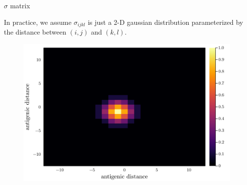 \documentclass{beamer}
\begin{document}
\begin{frame}{$\sigma$ matrix}
    
    In practice, we assume $\sigma_{ijkl}$ is just a 2-D gaussian distribution parameterized by the distance between $(i,j)$ and $(k,l)$.
    \begin{figure}
        \includegraphics[width=\textwidth]{../SarsEvoModel/plots/sigma.png}
    \end{figure}

\end{frame}
\end{document}
